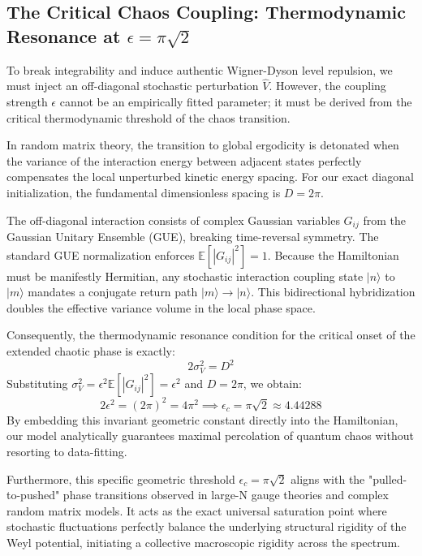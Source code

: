 \documentclass[prl,aps,floatfix,superscriptaddress,10pt]{revtex4-2}
\begin{document}
\subsection{The Critical Chaos Coupling: Thermodynamic Resonance at $\epsilon = \pi \sqrt{2}$}

To break integrability and induce authentic Wigner-Dyson level repulsion, we must inject an off-diagonal stochastic perturbation $\hat{V}$. However, the coupling strength $\epsilon$ cannot be an empirically fitted parameter; it must be derived from the critical thermodynamic threshold of the chaos transition.

In random matrix theory, the transition to global ergodicity is detonated when the variance of the interaction energy between adjacent states perfectly compensates the local unperturbed kinetic energy spacing. For our exact diagonal initialization, the fundamental dimensionless spacing is $D = 2\pi$.

The off-diagonal interaction consists of complex Gaussian variables $G_{ij}$ from the Gaussian Unitary Ensemble (GUE), breaking time-reversal symmetry. The standard GUE normalization enforces $\mathbb{E}[|G_{ij}|^2] = 1$. Because the Hamiltonian must be manifestly Hermitian, any stochastic interaction coupling state $|n\rangle$ to $|m\rangle$ mandates a conjugate return path $|m\rangle \to |n\rangle$. This bidirectional hybridization doubles the effective variance volume in the local phase space. 

Consequently, the thermodynamic resonance condition for the critical onset of the extended chaotic phase is exactly:
\begin{equation}
2 \sigma_V^2 = D^2
\end{equation}
Substituting $\sigma_V^2 = \epsilon^2 \mathbb{E}[|G_{ij}|^2] = \epsilon^2$ and $D = 2\pi$, we obtain:
\begin{equation}
2 \epsilon^2 = (2\pi)^2 = 4\pi^2 \implies \boxed{ \epsilon_c = \pi \sqrt{2} \approx 4.44288 }
\end{equation}
By embedding this invariant geometric constant directly into the Hamiltonian, our model analytically guarantees maximal percolation of quantum chaos without resorting to data-fitting.

Furthermore, this specific geometric threshold $\epsilon_c = \pi\sqrt{2}$ aligns with the "pulled-to-pushed" phase transitions observed in large-N gauge theories and complex random matrix models\cite{Gross1980, Cunden2018}. It acts as the exact universal saturation point where stochastic fluctuations perfectly balance the underlying structural rigidity of the Weyl potential, initiating a collective macroscopic rigidity across the spectrum.
\end{document}
